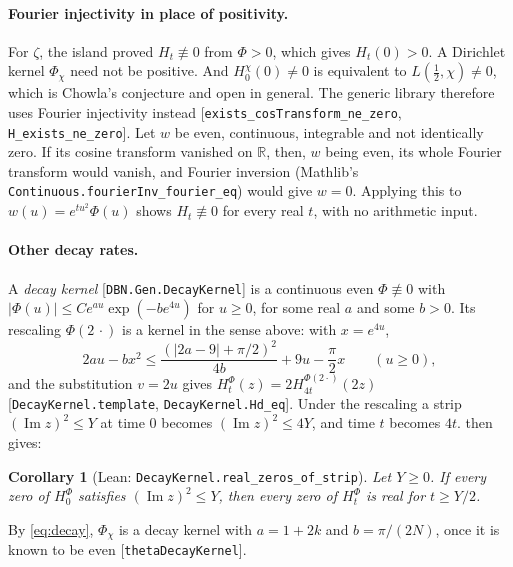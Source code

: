 \documentclass[11pt]{article}
\newtheorem{corollary}[theorem]{Corollary}
\theoremstyle{definition}
\newcommand{\lean}[1]{\texttt{#1}}
\newcommand{\im}{\operatorname{Im}}
\newcommand{\R}{\mathbb{R}}
\begin{document}
\paragraph{Fourier injectivity in place of positivity.} For $\zeta$, the island proved $H_t \not\equiv 0$ from $\Phi > 0$, which gives $H_t(0) > 0$. A Dirichlet kernel $\Phi_\chi$ need not be positive. And $H^\chi_0(0) \ne 0$ is equivalent to $L(\tfrac12,\chi) \ne 0$, which is Chowla's conjecture and open in general. The generic library therefore uses Fourier injectivity instead [\lean{exists\_\allowbreak{}cosTransform\_\allowbreak{}ne\_\allowbreak{}zero}, \lean{H\_\allowbreak{}exists\_\allowbreak{}ne\_\allowbreak{}zero}]. Let $w$ be even, continuous, integrable and not identically zero. If its cosine transform vanished on $\R$, then, $w$ being even, its whole Fourier transform would vanish, and Fourier inversion (Mathlib's \lean{Continuous.fourierInv\_\allowbreak{}fourier\_\allowbreak{}eq}) would give $w = 0$. Applying this to $w(u) = e^{tu^2}\Phi(u)$ shows $H_t \not\equiv 0$ for every real $t$, with no arithmetic input.

\paragraph{Other decay rates.} A \emph{decay kernel} [\lean{DBN.Gen.DecayKernel}] is a continuous even $\Phi \not\equiv 0$ with $|\Phi(u)| \le Ce^{au}\exp(-be^{4u})$ for $u \ge 0$, for some real $a$ and some $b > 0$. Its rescaling $\Phi(2\,\cdot)$ is a kernel in the sense above: with $x = e^{4u}$,
\[
2au - bx^2 \le \frac{(|2a-9|+\pi/2)^2}{4b} + 9u - \frac\pi2 x \qquad (u \ge 0),
\]
and the substitution $v = 2u$ gives $H^{\Phi}_t(z) = 2H^{\Phi(2\cdot)}_{4t}(2z)$ [\lean{DecayKernel.template}, \lean{DecayKernel.Hd\_\allowbreak{}eq}]. Under the rescaling a strip $(\im z)^2 \le Y$ at time $0$ becomes $(\im z)^2 \le 4Y$, and time $t$ becomes $4t$.  then gives:

\begin{corollary}[Lean: \lean{DecayKernel.real\_\allowbreak{}zeros\_\allowbreak{}of\_\allowbreak{}strip}]\label{cor:strip}
Let $Y \ge 0$. If every zero of $H^\Phi_0$ satisfies $(\im z)^2 \le Y$, then every zero of $H^\Phi_t$ is real for $t \ge Y/2$.
\end{corollary}

\noindent
By \eqref{eq:decay}, $\Phi_\chi$ is a decay kernel with $a = 1 + 2k$ and $b = \pi/(2N)$, once it is known to be even [\lean{thetaDecayKernel}].
\end{document}
